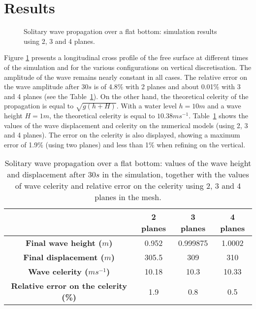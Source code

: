 \section{Results}
%
\begin{figure}[H]
\begin{center}
\caption{Solitary wave propagation over a flat bottom: simulation results using 2, 3 and 4 planes.}
\label{fig:solit_results}
\end{center}
\end{figure}
%
Figure \ref{fig:solit_results} presents a longitudinal cross profile of the free surface
at different times of the simulation and for the various configurations
on vertical discretisation.
The amplitude of the wave remains nearly constant in all cases.
The relative error on the wave amplitude after $30s$ is of 4.8\% with 2 planes and about 0.01\%
with 3 and 4 planes (see the Table~\ref{tab:solit_celerity}).
On the other hand, the theoretical celerity of the propagation is equal to $\sqrt{g(h+H)}$.
With a water level $h = 10m$ and a wave height $H=1m$,
the theoretical celerity is equal to $10.38ms^{-1}$.
Table~\ref{tab:solit_celerity} shows the values of the wave displacement and celerity
on the numerical models (using 2, 3 and 4 planes). The error on the celerity is also
displayed, showing a maximum error of 1.9\% (using two planes) and less than 1\% when refining on the vertical.
\begin{table}[H]
\caption{Solitary wave propagation over a flat bottom:
values of the wave height and displacement after $30s$ in the simulation,
together with the values of wave celerity and relative error on the celerity
using 2, 3 and 4 planes in the mesh.}
\label{tab:solit_celerity}
\begin{center}\begin{tabular}{|c|c|c|c|}
\hline
~ & \textbf{2 planes} & \textbf{3 planes} & \textbf{4 planes}\\
\hline
\textbf{Final wave height ($m$)} & 0.952 & 0.999875 & 1.0002 \\
\hline
\textbf{Final displacement ($m$)} & 305.5 & 309 & 310 \\
\hline
\textbf{Wave celerity ($ms^{-1}$)} & 10.18 & 10.3 & 10.33 \\
\hline
\textbf{Relative error on the celerity (\%)} & 1.9 & 0.8 & 0.5 \\
\hline
\end{tabular}\end{center}
\end{table}
